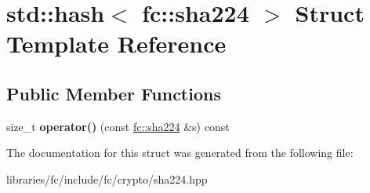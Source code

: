 \hypertarget{structstd_1_1hash_3_01fc_1_1sha224_01_4}{}\section{std\+:\+:hash$<$ fc\+:\+:sha224 $>$ Struct Template Reference}
\label{structstd_1_1hash_3_01fc_1_1sha224_01_4}
\subsection*{Public Member Functions}
\begin{DoxyCompactItemize}
\item 
\mbox{\label{structstd_1_1hash_3_01fc_1_1sha224_01_4_a28b35c93a65d7e597851e8eca3475b4d}} 
size\+\_\+t {\bfseries operator()} (const \mbox{\hyperlink{classfc_1_1sha224}{fc\+::sha224}} \&s) const
\end{DoxyCompactItemize}


The documentation for this struct was generated from the following file\+:\begin{DoxyCompactItemize}
\item 
libraries/fc/include/fc/crypto/sha224.\+hpp\end{DoxyCompactItemize}
